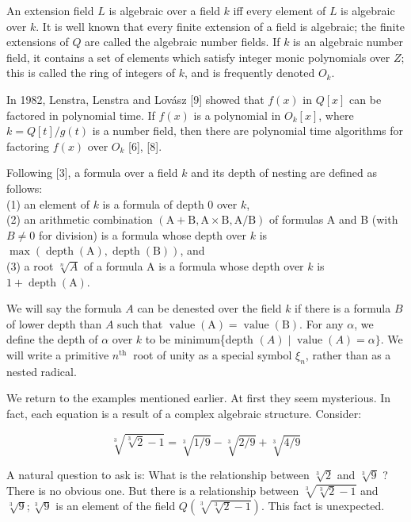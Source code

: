 \documentclass[11pt,letterpaper]{article}
\begin{document}
An extension field $L$ is algebraic over a field $k$ iff every element of $L$ is algebraic over $k$. It is well known that every finite extension of a field is algebraic; the finite extensions of $Q$ are called the algebraic number fields. If $k$ is an algebraic number field, it contains a set of elements which satisfy integer monic polynomials over $Z$; this is called the ring of integers of $k$, and is frequently denoted $O_{k}$.

In 1982, Lenstra, Lenstra and Lovász [9] showed that $f(x)$ in $Q[x]$ can be factored in polynomial time. If $f(x)$ is a polynomial in $O_{k}[x]$, where $k=Q[t] / g(t)$ is a number field, then there are polynomial time algorithms for factoring $f(x)$ over $O_{k}$ [6], [8].

Following [3], a formula over a field $k$ and its depth of nesting are defined as follows:\\
(1) an element of $k$ is a formula of depth 0 over $k$,\\
(2) an arithmetic combination $(\mathrm{A}+\mathrm{B}, \mathrm{A} \times \mathrm{B}, \mathrm{A} / \mathrm{B})$ of formulas A and B (with $B\ne0$ for division) is a formula whose depth over $k$ is $\max (\operatorname{depth}(\mathrm{A}), \operatorname{depth}(\mathrm{B}))$, and\\
(3) a root $\sqrt[n]{A}$ of a formula A is a formula whose depth over $k$ is $1+\operatorname{depth}(\mathrm{A})$.

We will say the formula $A$ can be denested over the field $k$ if there is a formula $B$ of lower depth than $A$ such that $\operatorname{value}(\mathrm{A})=\operatorname{value}(\mathrm{B})$. For any $\alpha$, we define the depth of $\alpha$ over $k$ to be minimum\{depth $(A) \mid \operatorname{value}(A)=\alpha\}$. We will write a primitive $n^{\text {th }}$ root of unity as a special symbol $\xi_{n}$, rather than as a nested radical.

We return to the examples mentioned earlier. At first they seem mysterious. In fact, each equation is a result of a complex algebraic structure. Consider:

\[
\sqrt[3]{\sqrt[3]{2}-1}=\sqrt[3]{1 / 9}-\sqrt[3]{2 / 9}+\sqrt[3]{4 / 9}
\]

A natural question to ask is: What is the relationship between $\sqrt[3]{2}$ and $\sqrt[3]{9}$ ? There is no obvious one. But there is a relationship between $\sqrt[3]{\sqrt[3]{2}-1}$ and $\sqrt[3]{9} ; \sqrt[3]{9}$ is an element of the field $Q(\sqrt[3]{\sqrt[3]{2}-1})$. This fact is unexpected.
\end{document}

